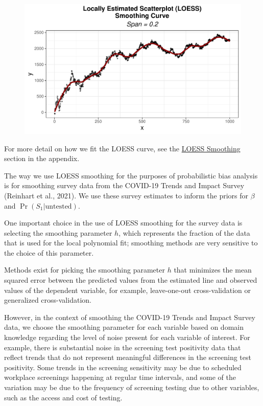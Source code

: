 \documentclass[12pt,twoside]{smiththesis}
\begin{document}
\begin{figure}

{\centering \includegraphics[width=1\linewidth]{thesis_files/figure-latex/unnamed-chunk-31-1} 

}

\caption{\label{fig:smooth-spans}}\label{fig:unnamed-chunk-31}
\end{figure}
For more detail on how we fit the LOESS curve, see the \protect\hyperlink{loess}{LOESS Smoothing} section in the appendix.

The way we use LOESS smoothing for the purposes of probabilistic bias analysis is for smoothing survey data from the COVID-19 Trends and Impact Survey (Reinhart et al., 2021). We use these survey estimates to inform the priors for \(\beta\) and \(\Pr(S_1|\text{untested})\).

One important choice in the use of LOESS smoothing for the survey data is selecting the smoothing parameter \(h\), which represents the fraction of the data that is used for the local polynomial fit; smoothing methods are very sensitive to the choice of this parameter.

Methods exist for picking the smoothing parameter \(h\) that minimizes the mean squared error between the predicted values from the estimated line and observed values of the dependent variable, for example, leave-one-out cross-validation or generalized cross-validation.

However, in the context of smoothing the COVID-19 Trends and Impact Survey data, we choose the smoothing parameter for each variable based on domain knowledge regarding the level of noise present for each variable of interest. For example, there is substantial noise in the screening test positivity data that reflect trends that do not represent meaningful differences in the screening test positivity. Some trends in the screening sensitivity may be due to scheduled workplace screenings happening at regular time intervals, and some of the variation may be due to the frequency of screening testing due to other variables, such as the access and cost of testing.
\end{document}
